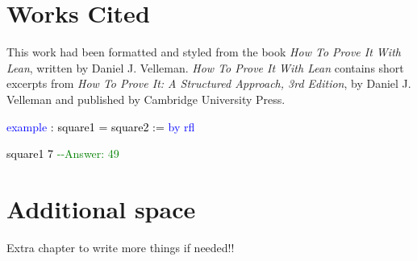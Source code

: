 \documentclass[
  letterpaper,
  DIV=11,
  numbers=noendperiod]{scrreprt}
\makeatletter
\newenvironment{Shaded}{\begin{snugshade}}{\end{snugshade}}
\newcommand{\CommentTok}[1]{\textcolor[rgb]{0.37,0.37,0.37}{#1}}
\newcommand{\DocumentationTok}[1]{\textcolor[rgb]{0.37,0.37,0.37}{\textit{#1}}}
\newcommand{\KeywordTok}[1]{\textcolor[rgb]{0.00,0.23,0.31}{#1}}
\newcommand{\NormalTok}[1]{\textcolor[rgb]{0.00,0.23,0.31}{#1}}
\newcommand{\SpecialCharTok}[1]{\textcolor[rgb]{0.37,0.37,0.37}{#1}}
\def\bluesquiggly{\bgroup \markoverwith{\textcolor[HTML]{1E90FF}{\lower3.5\p@\hbox{\sixly \char58}}}\ULon}
\renewcommand{\NormalTok}[1]{\textcolor[HTML]{000000}{#1}}
\renewcommand{\KeywordTok}[1]{\textcolor[HTML]{0000FF}{#1}}
\renewcommand{\SpecialCharTok}[1]{}
\renewcommand{\CommentTok}[1]{\textcolor[HTML]{008000}{#1}}
\renewcommand{\DocumentationTok}[1]{\bluesquiggly{\textcolor[HTML]{0000FF}{#1}}}
\theoremstyle{remark}
\makeatother
\begin{document}

\hypertarget{works-cited}{%
\chapter{Works Cited}\label{works-cited}}

This work had been formatted and styled from the book \emph{How To Prove
It With Lean}, written by Daniel J. Velleman. \emph{How To Prove It With
Lean} contains short excerpts from \emph{How To Prove It: A Structured
Approach, 3rd Edition}, by Daniel J. Velleman and published by Cambridge
University Press.

\begin{Shaded}
\begin{Highlighting}[]
\KeywordTok{example}\NormalTok{ : square1 = square2 := }\KeywordTok{by} \KeywordTok{rfl}

\SpecialCharTok{++}\DocumentationTok{\#eval}\SpecialCharTok{::}\NormalTok{ square1 7     }\CommentTok{{-}{-}Answer: 49}
\end{Highlighting}
\end{Shaded}


\hypertarget{additional-space}{%
\chapter{Additional space}\label{additional-space}}

Extra chapter to write more things if needed!!
\end{document}
